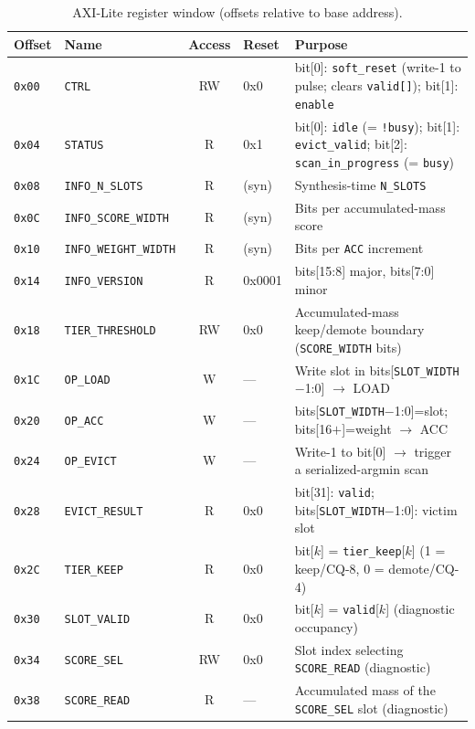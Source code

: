 \documentclass[11pt]{article}
\begin{document}
\begin{table}[h]
\centering
\small
\caption{AXI-Lite register window (offsets relative to base address).}
\label{tab:regs}
\begin{tabular}{@{}l l c l p{6.4cm}@{}}
\toprule
Offset & Name & Access & Reset & Purpose \\
\midrule
\texttt{0x00} & \texttt{CTRL}              & RW  & 0x0   & bit[0]: \texttt{soft\_reset} (write-1 to pulse; clears \texttt{valid[]}); bit[1]: \texttt{enable} \\
\texttt{0x04} & \texttt{STATUS}            & R   & 0x1   & bit[0]: \texttt{idle} (= \texttt{!busy}); bit[1]: \texttt{evict\_valid}; bit[2]: \texttt{scan\_in\_progress} (= \texttt{busy}) \\
\texttt{0x08} & \texttt{INFO\_N\_SLOTS}    & R   & (syn) & Synthesis-time \texttt{N\_SLOTS} \\
\texttt{0x0C} & \texttt{INFO\_SCORE\_WIDTH}& R   & (syn) & Bits per accumulated-mass score \\
\texttt{0x10} & \texttt{INFO\_WEIGHT\_WIDTH}& R  & (syn) & Bits per \texttt{ACC} increment \\
\texttt{0x14} & \texttt{INFO\_VERSION}     & R   & 0x0001& bits[15:8] major, bits[7:0] minor \\
\texttt{0x18} & \texttt{TIER\_THRESHOLD}   & RW  & 0x0   & Accumulated-mass keep/demote boundary (\texttt{SCORE\_WIDTH} bits) \\
\texttt{0x1C} & \texttt{OP\_LOAD}          & W   & ---   & Write slot in bits[\texttt{SLOT\_WIDTH}$-$1:0] $\to$ LOAD \\
\texttt{0x20} & \texttt{OP\_ACC}           & W   & ---   & bits[\texttt{SLOT\_WIDTH}$-$1:0]=slot; bits[16$+$]=weight $\to$ ACC \\
\texttt{0x24} & \texttt{OP\_EVICT}         & W   & ---   & Write-1 to bit[0] $\to$ trigger a serialized-argmin scan \\
\texttt{0x28} & \texttt{EVICT\_RESULT}     & R   & 0x0   & bit[31]: \texttt{valid}; bits[\texttt{SLOT\_WIDTH}$-$1:0]: victim slot \\
\texttt{0x2C} & \texttt{TIER\_KEEP}        & R   & 0x0   & bit[$k$] = \texttt{tier\_keep}[$k$] (1 = keep/CQ-8, 0 = demote/CQ-4) \\
\texttt{0x30} & \texttt{SLOT\_VALID}       & R   & 0x0   & bit[$k$] = \texttt{valid}[$k$] (diagnostic occupancy) \\
\texttt{0x34} & \texttt{SCORE\_SEL}        & RW  & 0x0   & Slot index selecting \texttt{SCORE\_READ} (diagnostic) \\
\texttt{0x38} & \texttt{SCORE\_READ}       & R   & ---   & Accumulated mass of the \texttt{SCORE\_SEL} slot (diagnostic) \\
\bottomrule
\end{tabular}
\end{table}
\end{document}
